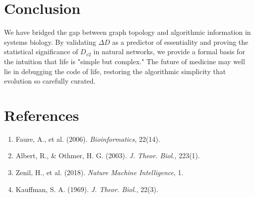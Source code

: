 \documentclass{article}
\begin{document}
\section{Conclusion}
We have bridged the gap between graph topology and algorithmic information in systems biology. By validating $\Delta D$ as a predictor of essentiality and proving the statistical significance of $D_{v2}$ in natural networks, we provide a formal basis for the intuition that life is "simple but complex." The future of medicine may well lie in debugging the code of life, restoring the algorithmic simplicity that evolution so carefully curated.

\section{References}
\begin{enumerate}
    \item Faure, A., et al. (2006). \textit{Bioinformatics}, 22(14).
    \item Albert, R., \& Othmer, H. G. (2003). \textit{J. Theor. Biol.}, 223(1).
    \item Zenil, H., et al. (2018). \textit{Nature Machine Intelligence}, 1.
    \item Kauffman, S. A. (1969). \textit{J. Theor. Biol.}, 22(3).
\end{enumerate}
\end{document}
